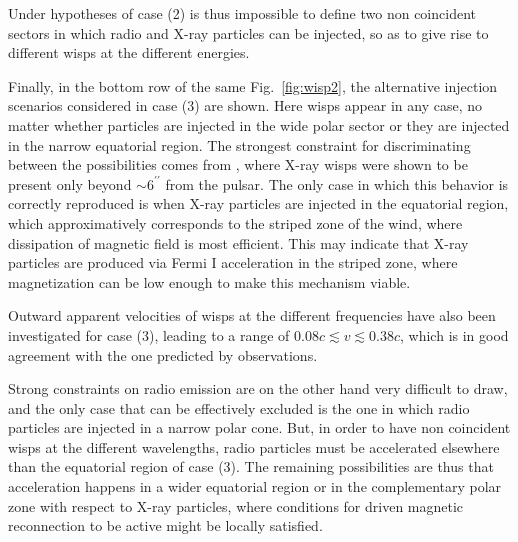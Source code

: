 Under hypotheses of case (2) is thus impossible to define two non coincident sectors in which radio and X-ray particles can be injected, so as to give rise to different wisps at the different energies.

Finally, in the bottom row of the same Fig.~\ref{fig:wisp2}, the alternative injection scenarios considered in case (3) are shown. 
Here wisps appear in any case, no matter whether particles are injected in the wide polar sector or they are injected in the narrow equatorial region. 
The strongest constraint for discriminating between the possibilities comes from \citet{Schweizer:2013}, 
where X-ray wisps were shown to be present only beyond $\sim 6^{\prime\prime}$ from the pulsar. 
The only case in which this behavior is correctly reproduced is when X-ray particles are injected in the equatorial region, which approximatively corresponds to the striped zone of the wind, where dissipation of magnetic field is most efficient.
This may indicate that X-ray particles are produced via Fermi I acceleration in the striped zone, where magnetization can be low enough to make this mechanism viable.

Outward apparent velocities of wisps at the different frequencies have also been investigated for case (3), leading to a range of $0.08c \lesssim v \lesssim 0.38c$, which is in good agreement with the one predicted by observations.

Strong constraints on radio emission are on the other hand very difficult to draw, and the only case that can be effectively excluded is the one in which radio particles are injected in a narrow polar cone. 
But, in order to have non coincident wisps at the different wavelengths, radio particles must be accelerated elsewhere than the equatorial region of case (3). 
The remaining possibilities are thus that acceleration happens in a wider equatorial region or in the complementary polar zone with respect to X-ray particles, where conditions for driven magnetic reconnection to be active might be locally satisfied.
